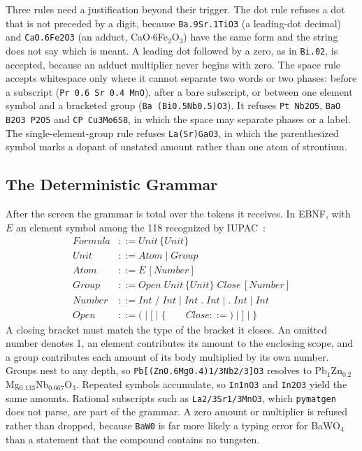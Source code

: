 \documentclass[10pt,journal]{IEEEtran}
\newcommand{\pmg}{\texttt{pymatgen}\xspace}
\begin{document}
Three rules need a justification beyond their trigger. The dot rule refuses a dot that is not preceded by a digit, because \texttt{Ba.9Sr.1TiO3} (a leading-dot decimal) and \texttt{CaO.6Fe2O3} (an adduct, CaO$\cdot$6Fe$_2$O$_3$) have the same form and the string does not say which is meant. A leading dot followed by a zero, as in \texttt{Bi.02}, is accepted, because an adduct multiplier never begins with zero. The space rule accepts whitespace only where it cannot separate two words or two phases: before a subscript (\texttt{Pr 0.6 Sr 0.4 MnO}), after a bare subscript, or between one element symbol and a bracketed group (\texttt{Ba (Bi0.5Nb0.5)O3}). It refuses \texttt{Pt Nb2O5}, \texttt{BaO B2O3 P2O5} and \texttt{CP Cu3Mo6S8}, in which the space may separate phases or a label. The single-element-group rule refuses \texttt{La(Sr)GaO3}, in which the parenthesized symbol marks a dopant of unstated amount rather than one atom of strontium.

\subsection{The Deterministic Grammar}
\label{sec:grammar}
After the screen the grammar is total over the tokens it receives. In EBNF, with $E$ an element symbol among the 118 recognized by IUPAC~\cite{ohrstrom2016elements}:
\begin{align*}
\mathit{Formula} &::= \mathit{Unit}\,\{\mathit{Unit}\}\\
\mathit{Unit}    &::= \mathit{Atom} \mid \mathit{Group}\\
\mathit{Atom}    &::= E\,[\mathit{Number}]\\
\mathit{Group}   &::= \mathit{Open}\;\mathit{Unit}\,\{\mathit{Unit}\}\;\mathit{Close}\,[\mathit{Number}]\\
\mathit{Number}  &::= \mathit{Int}\;\texttt{/}\;\mathit{Int} \mid \mathit{Int}\;\texttt{.}\;\mathit{Int} \mid \texttt{.}\;\mathit{Int} \mid \mathit{Int}\\
\mathit{Open}    &::= \texttt{(} \mid \texttt{[} \mid \texttt{\{} \qquad \mathit{Close} ::= \texttt{)} \mid \texttt{]} \mid \texttt{\}}
\end{align*}
A closing bracket must match the type of the bracket it closes. An omitted number denotes 1, an element contributes its amount to the enclosing scope, and a group contributes each amount of its body multiplied by its own number. Groups nest to any depth, so \texttt{Pb[(Zn0.6Mg0.4)1/3Nb2/3]O3} resolves to Pb$_1$Zn$_{0.2}$Mg$_{0.133}$Nb$_{0.667}$O$_3$. Repeated symbols accumulate, so \texttt{InInO3} and \texttt{In2O3} yield the same amounts. Rational subscripts such as \texttt{La2/3Sr1/3MnO3}, which \pmg does not parse, are part of the grammar. A zero amount or multiplier is refused rather than dropped, because \texttt{BaW0} is far more likely a typing error for BaWO$_4$ than a statement that the compound contains no tungsten.
\end{document}
